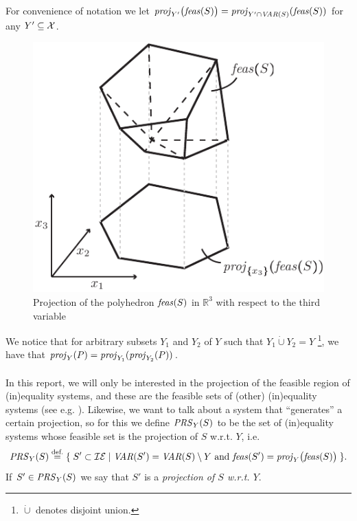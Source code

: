 For convenience of notation we let $\mathit{proj}_{Y'}\big(\mathit{feas}(S)\big) = \mathit{proj}_{Y'\cap \mathit{VAR}(S)}(\mathit{feas}(S))$ for any $Y'\subseteq \mathcal{X}$.

\begin{figure}
	\centering
		\includegraphics{figures/projection.pdf}
	\caption{Projection of the polyhedron $\mathit{feas}(S)$ in $\mathbb{R}^3$ with respect to the third variable }
	\label{fig:proj}
\end{figure}
We notice that for arbitrary subsets $Y_1$ and $Y_2$ of $Y$ such that $Y_1\dot\cup Y_2=Y$ \footnote{$\dot\cup$ denotes disjoint union.}, we have that $\mathit{proj}_Y(P)=\mathit{proj}_{Y_1}(\mathit{proj}_{Y_2}(P))$. 
\\\\
In this report, we will only be interested in the projection of the feasible region of (in)equality systems,
and these are the feasible sets of (other) (in)equality systems (see e.g. \cite{ziegler95}). 
Likewise, we want to talk about a system that ``generates'' a certain projection, so for this we define $\mathit{PRS}_Y(S)$ to be the set of (in)equality systems whose feasible set is the projection of $S$ w.r.t. $Y$, i.e. 
\[
\mathit{PRS}_Y(S)\overset{\text{def.}}= \{\;{S'\subset\mathcal{IE}}\;|\;{\mathit{VAR}(S')=\mathit{VAR}(S)\setminus Y \text{ and }\mathit{feas}(S') = \mathit{proj}_Y\big(\mathit{feas}(S)\big)}\;\}.
\]
If $S'\in\mathit{PRS}_Y(S)$ we say that $S'$ is a \emph{projection of $S$ w.r.t. $Y$}.
 
